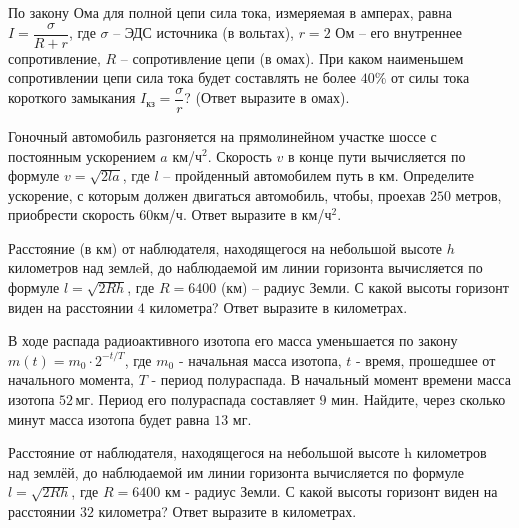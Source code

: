 \begin{class}[number=6]
\begin{listofex}
		\item По закону Ома для полной цепи сила тока, измеряемая в амперах, равна \( I=\dfrac{\sigma}{R+r} \), где \(\sigma\) – ЭДС источника (в вольтах), \(r=2\) Ом – его внутреннее сопротивление, \(R\) – сопротивление цепи (в омах). При каком наименьшем сопротивлении цепи сила тока будет составлять не более \(40\% \) от силы тока короткого замыкания \( I_{кз} =\dfrac{\sigma}{r}\)? (Ответ выразите в омах).
		\item Гоночный автомобиль разгоняется на прямолинейном участке шоссе с постоянным ускорением \( a \) км/ч\( ^2 \). Скорость \( v \)  в конце пути вычисляется по формуле \( v=\sqrt{2la} \), где \( l \) – пройденный автомобилем путь в км. Определите ускорение, с которым должен двигаться автомобиль, чтобы, проехав \( 250 \) метров, приобрести скорость \( 60 \)км/ч. Ответ выразите в км/ч\( ^2 \).
		\item Расстояние (в км) от наблюдателя, находящегося на небольшой высоте \( h \) километров над землeй, до наблюдаемой им линии горизонта вычисляется по формуле \( l=\sqrt{2Rh} \), где \( R = 6400 \) (км) – радиус Земли. С какой высоты горизонт виден на расстоянии \(4\) километра? Ответ выразите в километрах.
		\item В ходе распада радиоактивного изотопа его масса уменьшается по закону \( m(t)=m_0\cdot2^{-t/T} \), где \( m_0 \) - начальная масса изотопа,  \( t \) - время, прошедшее от начального момента, \( T \) - период полураспада. В начальный момент времени масса изотопа \( 52 \) мг. Период его полураспада составляет \( 9  \) мин. Найдите, через сколько минут масса изотопа будет равна \( 13  \) мг.
		\item Расстояние от наблюдателя, находящегося на небольшой высоте  h километров над землёй, до наблюдаемой им линии горизонта вычисляется по формуле \( l=\sqrt{2Rh} \), где \( R=6400 \) км - радиус Земли. С какой высоты горизонт виден на расстоянии \( 32 \) километра? Ответ выразите в километрах.
	\end{listofex}
\end{class}
%
%
%	
